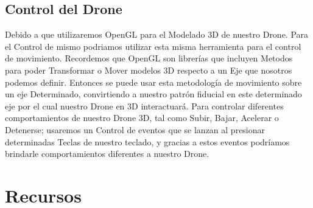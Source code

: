 \documentclass[a4paper]{article}
\begin{document}
\subsection{Control del Drone}
Debido a que utilizaremos OpenGL para el Modelado 3D de nuestro Drone. Para el Control de mismo podriamos utilizar esta misma herramienta para el control de movimiento. Recordemos que OpenGL son librerías que incluyen Metodos para poder Transformar o Mover modelos 3D respecto a un Eje que nosotros podemos definir. Entonces se puede usar esta metodología de movimiento sobre un eje Determinado, convirtiendo a nuestro patrón fiducial en este determinado eje por el cual nuestro Drone en 3D interactuará.
Para controlar diferentes comportamientos de nuestro Drone 3D, tal como Subir, Bajar, Acelerar o Detenerse; usaremos un Control de eventos que se lanzan al presionar determinadas Teclas de nuestro teclado, y gracias a estos eventos podríamos brindarle comportamientos diferentes a nuestro Drone.
\section{Recursos}




%

\end{document}

